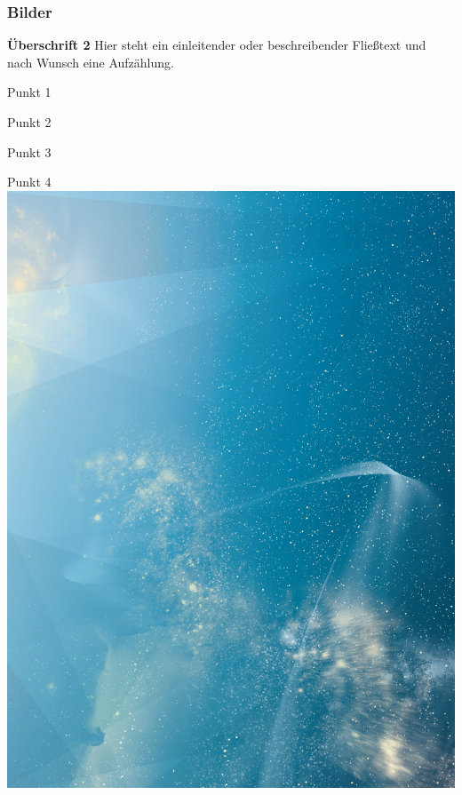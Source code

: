 \begin{frame}
    \frametitle{Bilder}

\begin{multicols}{2}
    \textbf{Überschrift 2}\newline
    Hier steht ein einleitender oder beschreibender Fließtext und nach Wunsch
    eine Aufzählung.

    Punkt 1

    Punkt 2

    Punkt 3

    Punkt 4
    \vfill\columnbreak
    \includegraphics[width=\columnwidth, height=.7\textheight]{./Ressourcen/_Bilder/SternenhimmelHochkant.jpg}%
\end{multicols}
    
\end{frame}
\clearpage


